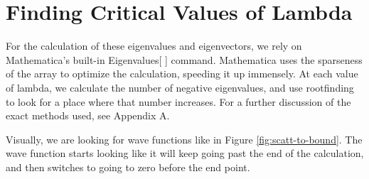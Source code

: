 \documentclass[12pt,twoside]{reedthesis}
\begin{document}
\section{Finding Critical Values of Lambda}
For the calculation of these eigenvalues and eigenvectors, we rely on Mathematica's built-in Eigenvalues[ ] command. Mathematica uses the sparseness of the array to optimize the calculation, speeding it up immensely. At each value of lambda, we calculate the number of negative eigenvalues, and use rootfinding to look for a place where that number increases. For a further discussion of the exact methods used, see Appendix A.

Visually, we are looking for wave functions like in Figure \ref{fig:scatt-to-bound}. The wave function starts looking like it will keep going past the end of the calculation, and then switches to going to zero before the end point.
\end{document}
